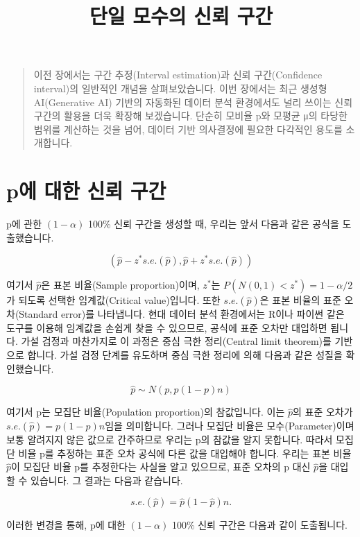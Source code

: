 \documentclass[
]{scrbook}
\title{단일 모수의 신뢰 구간}
\author{}
\date{}
\begin{document}
\frontmatter
\maketitle


\mainmatter
\begin{quote}
이전 장에서는 구간 추정(Interval estimation)과 신뢰 구간(Confidence
interval)의 일반적인 개념을 살펴보았습니다. 이번 장에서는 최근 생성형
AI(Generative AI) 기반의 자동화된 데이터 분석 환경에서도 널리 쓰이는
신뢰 구간의 활용을 더욱 확장해 보겠습니다. 단순히 모비율 p와 모평균 μ의
타당한 범위를 계산하는 것을 넘어, 데이터 기반 의사결정에 필요한 다각적인
용도를 소개합니다.
\end{quote}

\section{p에 대한 신뢰
구간}\label{puxc5d0-uxb300uxd55c-uxc2e0uxb8b0-uxad6cuxac04}

p에 관한 \((1-\alpha)\) 100\% 신뢰 구간을 생성할 때, 우리는 앞서 다음과
같은 공식을 도출했습니다.

\[
(\hat{p}-z^*s.e.(\hat{p}),\hat{p}+z^*s.e.(\hat{p}))
\]

여기서 \(\hat{p}\)은 표본 비율(Sample proportion)이며, \(z^*\)는
\(P(N(0,1)<z^*) = 1-\alpha/2\)가 되도록 선택한 임계값(Critical
value)입니다. 또한 \(s.e.(\hat{p})\)은 표본 비율의 표준 오차(Standard
error)를 나타냅니다. 현대 데이터 분석 환경에서는 R이나 파이썬 같은
도구를 이용해 임계값을 손쉽게 찾을 수 있으므로, 공식에 표준 오차만
대입하면 됩니다. 가설 검정과 마찬가지로 이 과정은 중심 극한 정리(Central
limit theorem)를 기반으로 합니다. 가설 검정 단계를 유도하며 중심 극한
정리에 의해 다음과 같은 성질을 확인했습니다.

\[
\hat{p}∼N(p,p(1-p)n)
\]

여기서 p는 모집단 비율(Population proportion)의 참값입니다. 이는
\(\hat{p}\)의 표준 오차가 \(s.e.(\hat{p})=p(1-p)n\)임을 의미합니다.
그러나 모집단 비율은 모수(Parameter)이며 보통 알려지지 않은 값으로
간주하므로 우리는 p의 참값을 알지 못합니다. 따라서 모집단 비율 p를
추정하는 표준 오차 공식에 다른 값을 대입해야 합니다. 우리는 표본 비율
\(\hat{p}\)이 모집단 비율 p를 추정한다는 사실을 알고 있으므로, 표준
오차의 p 대신 \(\hat{p}\)을 대입할 수 있습니다. 그 결과는 다음과
같습니다.

\[
s.e.(\hat{p})=\hat{p}(1-\hat{p})n.
\]

이러한 변경을 통해, p에 대한 \((1-\alpha)\) 100\% 신뢰 구간은 다음과
같이 도출됩니다.
\end{document}
